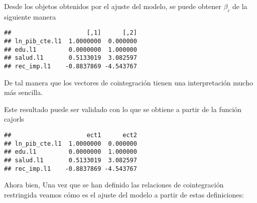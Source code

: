 \documentclass[]{book}
\newenvironment{Shaded}{\begin{snugshade}}{\end{snugshade}}
\newcommand{\KeywordTok}[1]{\textcolor[rgb]{0.13,0.29,0.53}{\textbf{#1}}}
\newcommand{\DataTypeTok}[1]{\textcolor[rgb]{0.13,0.29,0.53}{#1}}
\newcommand{\DecValTok}[1]{\textcolor[rgb]{0.00,0.00,0.81}{#1}}
\newcommand{\StringTok}[1]{\textcolor[rgb]{0.31,0.60,0.02}{#1}}
\newcommand{\OperatorTok}[1]{\textcolor[rgb]{0.81,0.36,0.00}{\textbf{#1}}}
\newcommand{\NormalTok}[1]{#1}
\theoremstyle{definition}
\theoremstyle{definition}
\theoremstyle{definition}
\theoremstyle{remark}
\begin{document}
Desde los objetos obtenidos por el ajuste del modelo, se puede obtener
\(\beta_c\) de la siguiente manera

\begin{Shaded}
\end{Shaded}

\begin{verbatim}
##                     [,1]      [,2]
## ln_pib_cte.l1  1.0000000  0.000000
## edu.l1         0.0000000  1.000000
## salud.l1       0.5133019  3.082597
## rec_imp.l1    -0.8837869 -4.543767
\end{verbatim}

De tal manera que los vectores de cointegración tienen una
interpretación mucho más sencilla.

Este resultado puede ser validado con lo que se obtiene a partir de la
función cajorls

\begin{Shaded}
\end{Shaded}

\begin{verbatim}
##                     ect1      ect2
## ln_pib_cte.l1  1.0000000  0.000000
## edu.l1         0.0000000  1.000000
## salud.l1       0.5133019  3.082597
## rec_imp.l1    -0.8837869 -4.543767
\end{verbatim}

Ahora bien, Una vez que se han definido las relaciones de cointegración
restringida veamos cómo es el ajuste del modelo a partir de estas
definiciones:
\end{document}
